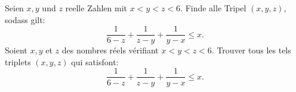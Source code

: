 {Seien $x,y$ und $z$ reelle Zahlen mit $x<y<z<6$. Finde alle Tripel $(x,y,z)$, sodass gilt:
\[
\frac{1}{6-z} + \frac{1}{z-y} + \frac{1}{y-x} \leq x.
\]}
{Soient $x,y$ et $z$ des nombres réels vérifiant $x<y<z<6$. Trouver tous les tels triplets $(x,y,z)$ qui satisfont:
\[
\frac{1}{6-z} + \frac{1}{z-y} + \frac{1}{y-x} \leq x.
\]}
{}